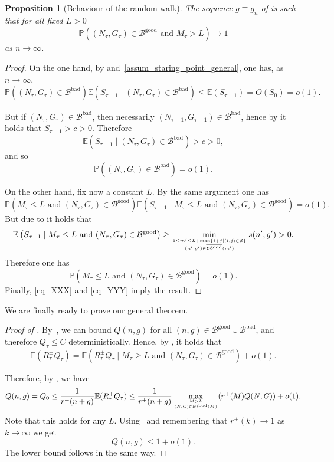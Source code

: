 \documentclass[a4paper,12pt]{article}
\newtheorem{proposition}[theorem]{Proposition}
\theoremstyle{definition}
\renewcommand{\P}{\mathbb{P}}
\newcommand{\nto}{\ensuremath{n\rightarrow\infty}}
\newcommand{\bigO}[1]{O\left({#1}\right)}
\newcommand{\goodB}{\mathcal{B}^{\text{good}}}
\newcommand{\goodBB}{\overline{\goodB}}
\newcommand{\badB}{\mathcal{B}^{\text{bad}}}
\newcommand{\badBB}{\overline{\badB}}
\begin{document}
\begin{proposition}[Behaviour of the random walk]\label{prop_behavior_RW_general}
    The sequence $g\equiv g_n$ of  is such that for all fixed $L>0$
    \[\P\left((N_\tau,G_\tau)\in\goodB\text{ and } M_\tau>L\right)\to 1\]
    as $\nto$.
\end{proposition}

\begin{proof}
    On the one hand, by  and~\cref{assum_staring_point_general}, one has, as $\nto$,
\[\P\left((N_\tau,G_\tau)\in\badB\right)\mathbb{E}\left(S_{\tau-1} \mid (N_\tau,G_\tau)\in\badB\right) \leq \mathbb{E}(S_{\tau-1})=\bigO{S_0}=o(1).\]

But if $(N_\tau,G_\tau)\in\badB$, then necessarily $(N_{\tau-1},G_{\tau-1})\in\badBB$, hence by   it holds that $S_{\tau-1} >c>0$. Therefore 
\[\mathbb{E}\left(S_{\tau-1} \mid (N_\tau,G_\tau)\in\badB\right)>c>0,\]
and so
\begin{equation}\label{eq_XXX}
    \P\left((N_\tau,G_\tau)\in\badB\right)=o(1).
\end{equation}

On the other hand, fix now a constant $L$. By the same argument one has
\[\P\left(M_\tau\leq L\text{ and }(N_\tau,G_\tau)\in\goodB\right)\mathbb{E}\left(S_{\tau-1} \mid M_\tau\leq L\text{ and }(N_\tau,G_\tau)\in\goodB\right)=o(1).\]
But due to  it holds that \[\mathbb{E}\left(S_{\tau-1} \mid M_\tau\leq L\text{ and }(N_\tau,G_\tau)\in\goodB\right)\geq \min_{1\leq m'\leq L+\max\{i+j\mid (i,j)\in \mathcal S\}\atop (n',g')\in\goodBB(m')}s(n',g')>0.\] 
Therefore one has
\begin{equation}\label{eq_YYY}
   \P\left(M_\tau\leq L\text{ and }(N_\tau,G_\tau)\in\goodB\right)=o(1).
\end{equation}
Finally, \eqref{eq_XXX} and \eqref{eq_YYY} imply the result.
\end{proof}


We are finally ready to prove our general theorem.
\begin{proof}[Proof of ]

    By~, we can bound $Q(n,g)$ for all $(n,g)\in\goodB\cup\badB$, and therefore $Q_\tau\leq C$ deterministically. Hence, by , it holds that
    \[\mathbb{E}(R^{\pm}_{\tau}Q_\tau)=\mathbb{E}\left(R^{\pm}_{\tau}Q_\tau \mid  M_\tau\geq L\text{ and }(N_\tau,G_\tau)\in\goodB\right)+o(1).\]
   
    Therefore, by , we have
    \[Q(n,g)=Q_0\leq\frac{1}{r^+(n+g)}\mathbb{E}(R^{+}_\tau Q_\tau)\leq \frac{1}{r^+(n+g)}\max_{M>L\atop (N,G)\in \goodB(M)}(r^{+}(M)Q(N,G))+o(1).\]
    Note that this holds for any $L$. Using~ and remembering that $r^+(k)\to 1$ as $k\to\infty$ we get
    \[Q(n,g)\leq 1+o(1).\]
The lower bound follows in the same way.
\end{proof}
\end{document}
